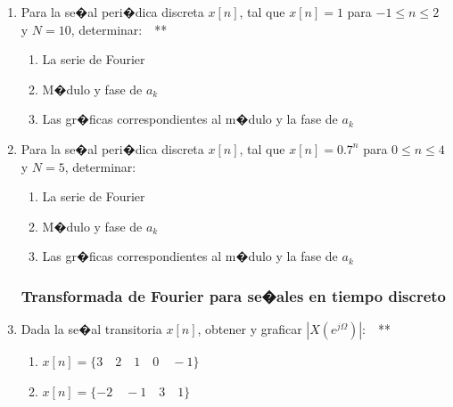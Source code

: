 \documentclass[10pt,a4paper]{article}
\begin{document}
\begin{enumerate}
\item {Para la se�al peri�dica discreta $x[n]$, tal que $x[n]=1$ para $-1 \leq n \leq 2$ y $N=10$, determinar:}~~**
\begin{enumerate}
	\item La serie de Fourier		
	\item M�dulo y fase de $a_k$
	\item Las gr�ficas correspondientes al m�dulo y la fase de $a_k$
\end{enumerate}	

\item {Para la se�al peri�dica discreta $x[n]$, tal que $x[n]=0.7^n$ para $0 \leq n \leq 4$ y $N=5$, determinar:}
\begin{enumerate}
	\item La serie de Fourier		
	\item M�dulo y fase de $a_k$
	\item Las gr�ficas correspondientes al m�dulo y la fase de $a_k$
\end{enumerate}

\subsubsection*{Transformada de Fourier para se�ales en tiempo discreto}
\item {Dada la se�al transitoria $x[n]$, obtener y graficar $|X(e^{j\Omega})|$:}~~**
\begin{enumerate}
	\item $x[n]=\{3\quad 2\quad 1\quad 0\quad -1\}$
	\item $x[n]=\{-2\quad -1\quad 3\quad 1\}$
\end{enumerate}	

\end{enumerate}

\end{document}
